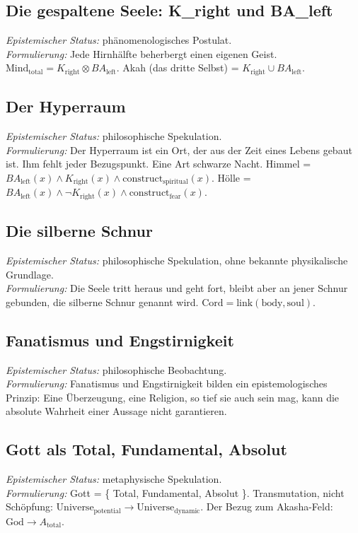 \documentclass[11pt,a4paper]{article}
\begin{document}
\subsection{Die gespaltene Seele: K\_right und BA\_left}
\textit{Epistemischer Status:} phänomenologisches Postulat. \\
\textit{Formulierung:} Jede Hirnhälfte beherbergt einen eigenen Geist. $\text{Mind}_{\text{total}} = K_{\text{right}} \otimes BA_{\text{left}}$. Akah (das dritte Selbst) = $K_{\text{right}} \cup BA_{\text{left}}$.

\subsection{Der Hyperraum}
\textit{Epistemischer Status:} philosophische Spekulation. \\
\textit{Formulierung:} Der Hyperraum ist ein Ort, der aus der Zeit eines Lebens gebaut ist. Ihm fehlt jeder Bezugspunkt. Eine Art schwarze Nacht. Himmel = $BA_{\text{left}}(x) \land K_{\text{right}}(x) \land \text{construct}_{\text{spiritual}}(x)$. Hölle = $BA_{\text{left}}(x) \land \neg K_{\text{right}}(x) \land \text{construct}_{\text{fear}}(x)$.

\subsection{Die silberne Schnur}
\textit{Epistemischer Status:} philosophische Spekulation, ohne bekannte physikalische Grundlage. \\
\textit{Formulierung:} Die Seele tritt heraus und geht fort, bleibt aber an jener Schnur gebunden, die silberne Schnur genannt wird. $\text{Cord} = \text{link}(\text{body}, \text{soul})$.

\subsection{Fanatismus und Engstirnigkeit}
\textit{Epistemischer Status:} philosophische Beobachtung. \\
\textit{Formulierung:} Fanatismus und Engstirnigkeit bilden ein epistemologisches Prinzip: Eine Überzeugung, eine Religion, so tief sie auch sein mag, kann die absolute Wahrheit einer Aussage nicht garantieren.

\subsection{Gott als Total, Fundamental, Absolut}
\textit{Epistemischer Status:} metaphysische Spekulation. \\
\textit{Formulierung:} Gott = \{ Total, Fundamental, Absolut \}. Transmutation, nicht Schöpfung: $\text{Universe}_{\text{potential}} \to \text{Universe}_{\text{dynamic}}$. Der Bezug zum Akasha-Feld: $\text{God} \to A_{\text{total}}$.
\end{document}
